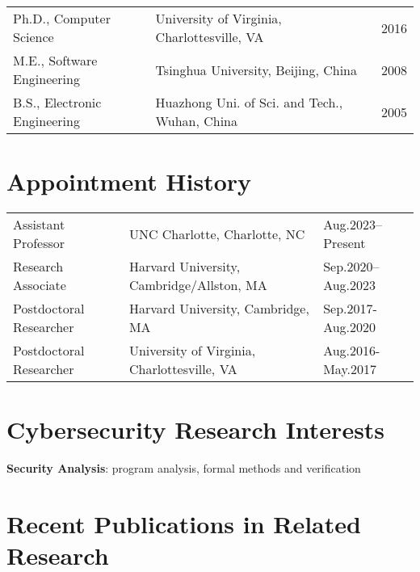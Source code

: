 \documentclass[12pt]{article}
\begin{document}
\begin{tabular}{p{6cm} p{9cm} R{1.5cm}}
    {Ph.D., Computer Science} & University of Virginia, Charlottesville, VA & {2016} \\
    {M.E., Software Engineering} & Tsinghua University, Beijing, China & {2008} \\
    {B.S., Electronic Engineering} & Huazhong Uni. of Sci. and Tech., Wuhan, China & {2005} \\
\end{tabular}



\section{Appointment History}

\begin{tabular}{p{5cm} p{7.5cm} R{4cm}}
    {Assistant Professor} & 
    UNC Charlotte, Charlotte, NC & Aug.2023–Present \\
    Research Associate &
    Harvard University, Cambridge/Allston, MA & Sep.2020–Aug.2023 \\
    Postdoctoral Researcher &
    Harvard University, Cambridge, MA & Sep.2017-Aug.2020 \\
    Postdoctoral Researcher &
    University of Virginia, Charlottesville, VA & Aug.2016-May.2017 \\
\end{tabular}

\section{Cybersecurity Research Interests}

\textbf{Security Analysis}: program analysis, formal methods and verification


\section{Recent Publications in Related Research}
\end{document}
